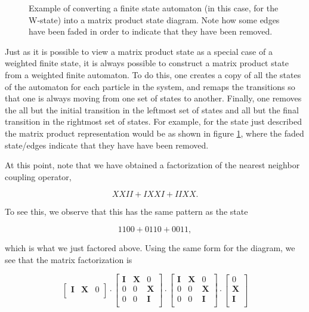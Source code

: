 \documentclass[12pt]{amsbook}
\theoremstyle{plain}
\theoremstyle{definition}
\theoremstyle{remark}
\begin{document}
\begin{figure}
\caption{Example of converting a finite state automaton (in this case, for the W-state) into a matrix product state diagram.  Note how some edges have been faded in order to indicate that they have been removed.}
\label{fig:automaton2mps}
\end{figure}

Just as it is possible to view a matrix product state as a special case of a weighted finite state, it is always possible to construct a matrix product state from a weighted finite automaton.  To do this, one creates a copy of all the states of the automaton for each particle in the system, and remaps the transitions so that one is always moving from one set of states to another.  Finally, one removes the all but the initial transition in the leftmost set of states and all but the final transition in the rightmost set of states.  For example, for the state just described the matrix product representation would be as shown in figure \ref{fig:automaton2mps}, where the faded state/edges indicate that they have have been removed.

At this point, note that we have obtained a factorization of the nearest neighbor coupling operator,

$$XXII + IXXI + IIXX.$$

To see this, we observe that this has the same pattern as the state

$$1100 + 0110 + 0011,$$

\noindent which is what we just factored above.  Using the same form for the diagram, we see that the matrix factorization is 

$$
\begin{bmatrix}
\textbf{I} & \textbf{X} & 0 \\
\end{bmatrix}
\cdot
\begin{bmatrix}
\textbf{I} & \textbf{X} & 0 \\
0 & 0 & \textbf{X} \\
0 & 0 & \textbf{I} \\
\end{bmatrix}
\cdot
\begin{bmatrix}
\textbf{I} & \textbf{X} & 0 \\
0 & 0 & \textbf{X} \\
0 & 0 & \textbf{I} \\
\end{bmatrix}
\cdot
\begin{bmatrix}
0 \\
\textbf{X} \\
\textbf{I} \\
\end{bmatrix}
$$
\end{document}
